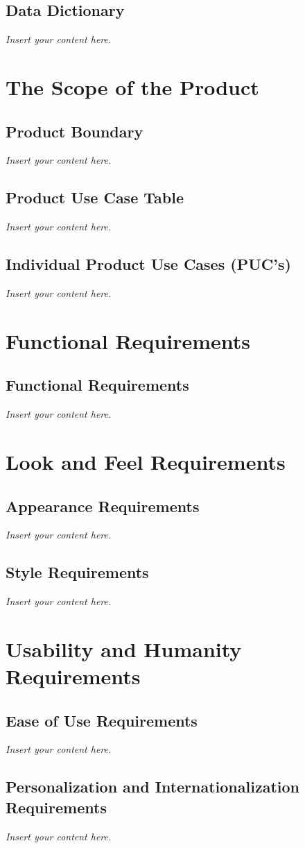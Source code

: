 \documentclass[12pt]{article}
\newcommand{\lips}{\textit{Insert your content here.}}
\begin{document}
\subsection{Data Dictionary}
\lips

\section{The Scope of the Product}
\subsection{Product Boundary}
\lips
\subsection{Product Use Case Table}
\lips
\subsection{Individual Product Use Cases (PUC's)}
\lips

\section{Functional Requirements}
\subsection{Functional Requirements}
\lips

\section{Look and Feel Requirements}
\subsection{Appearance Requirements}
\lips
\subsection{Style Requirements}
\lips

\section{Usability and Humanity Requirements}
\subsection{Ease of Use Requirements}
\lips
\subsection{Personalization and Internationalization Requirements}
\lips
\end{document}
